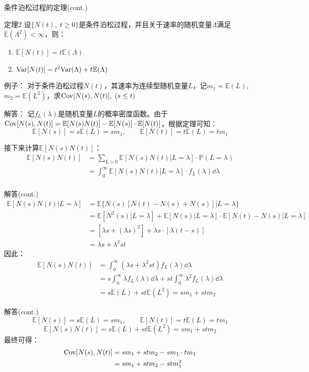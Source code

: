 \documentclass[t]{beamer}
\renewcommand{\Pr}{\mathbb{P}}
\newcommand{\E}{\mathbb{E}}
\newcommand{\Var}{{\rm Var}}
\newcommand{\Cov}{{\rm Cov}}
\begin{document}
\begin{frame}{条件泊松过程的定理(cont.)}
\begin{block}{定理2}
    设$\{N(t),\; t\ge 0\}$是条件泊松过程，并且关于速率的随机变量$\Lambda$满足$\E(\Lambda^2)<\infty$，则：	
    \begin{enumerate}[(1)]
        \item $\E[N(t)]=t\E(\Lambda)$
        \item $\Var[N(t)]=t^2\Var(\Lambda)+t\E(\Lambda)$
    \end{enumerate}
\end{block}
    

\end{frame}

\begin{frame}{例子：}
    对于条件泊松过程$N(t)$，其速率为连续型随机变量$L$，记$m_1=\E(L)$, $m_2=\E(L^2)$，求$\Cov[N(s),N(t)],\; (s\le t)$
\end{frame}

\begin{frame}{解答：}
记$f_L(\lambda)$是随机变量$L$的概率密度函数。由于$\Cov[N(s),N(t)]=\E[N(s)N(t)]-\E[N(s)]\cdot \E[N(t)]$，根据定理可知：
\[\E[N(s)]=s\E(L)=sm_1,\qquad  \E[N(t)]=t\E(L)=tm_1 \]
    
接下来计算$\E[N(s)N(t)]$：
\[\begin{split}
	\E[N(s)N(t)]&=\sum_{L>0}\E[N(s)N(t)|L=\lambda]\cdot \Pr(L=\lambda)\\ 
	&=\int^{\infty}_0 \E[N(s)N(t)|L=\lambda]\cdot f_L(\lambda)\dd\lambda\\ 
\end{split}\]
\end{frame}

\begin{frame}{解答(cont.)}
\[\begin{split}
	\E[N(s)N(t)|L=\lambda]&=\E\big\{N(s)[N(t)-N(s)+N(s)]|L=\lambda\big\} \\ 
	&=\E[N^2(s)|L=\lambda]+\E[N(s)|L=\lambda]\cdot \E[N(t)-N(s)|L=\lambda]\\ 
	&=\left[\lambda s+(\lambda s)^2\right]+\lambda s\cdot [\lambda(t-s)]\\ 
	&=\lambda s+\lambda^2 st
\end{split}
	\]
因此：\[\begin{split}
	\E[N(s)N(t)]&=\int^{\infty}_0 (\lambda s+\lambda^2 st)f_L(\lambda)\dd\lambda\\ 
	&=s\int^{\infty}_0 \lambda f_L(\lambda)\dd\lambda+st \int^{\infty}_0 \lambda^2 f_L(\lambda)\dd\lambda\\ 
	&=s\E(L)+st\E(L^2)=sm_1+stm_2
\end{split} \]


\end{frame}

\begin{frame}{解答(cont.)}
    \[\E[N(s)]=s\E(L)=sm_1,\qquad  \E[N(t)]=t\E(L)=tm_1 \]
\[\E[N(s)N(t)]=s\E(L)+st\E(L^2)=sm_1+stm_2\]
    最终可得：
    \[\begin{split}
        \Cov[N(s),N(t)]&=sm_1+stm_2-sm_1\cdot tm_1\\
        &=sm_1+stm_2-stm^2_1 
    \end{split}
        \]
\end{frame}    
\end{document}
